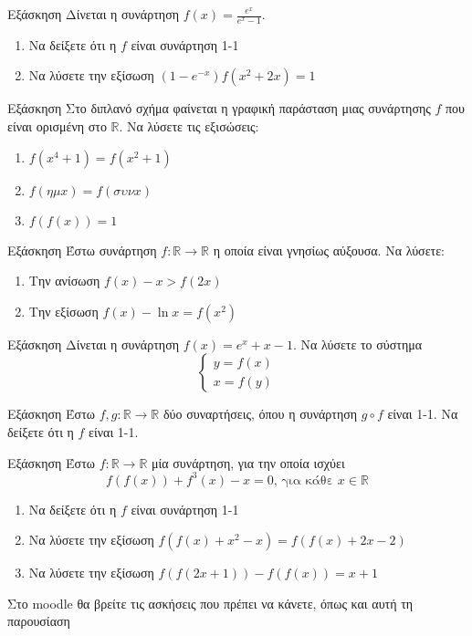 \documentclass[greek]{beamer}
\begin{document}
\begin{frame}{Εξάσκηση}
  Δίνεται η συνάρτηση $f(x)=\frac{e^x}{e^x-1}$.
  \begin{enumerate}
    \item Να δείξετε ότι η $f$ είναι συνάρτηση 1-1 \pause
    \item Να λύσετε την εξίσωση $(1-e^{-x})f(x^2+2x)=1$
  \end{enumerate}
\end{frame}

\begin{frame}{Εξάσκηση}
  Στο διπλανό σχήμα φαίνεται η γραφική παράσταση μιας συνάρτησης $f$ που είναι ορισμένη στο $\mathbb{R}$. Να λύσετε τις εξισώσεις:
  \begin{enumerate}
    \item $f(x^4+1)=f(x^2+1)$ \pause
    \item $f(ημ x)=f(συν x)$ \pause
    \item $f\left( f(x) \right)=1$
  \end{enumerate}
\end{frame}

\begin{frame}{Εξάσκηση}
  Έστω συνάρτηση $f:\mathbb{R}\to \mathbb{R}$ η οποία είναι γνησίως αύξουσα. Να λύσετε:
  \begin{enumerate}
    \item Την ανίσωση $f(x)-x>f(2x)$ \pause
    \item Την εξίσωση $f(x)-\ln x=f(x^2)$
  \end{enumerate}
\end{frame}

\begin{frame}{Εξάσκηση}
  Δίνεται η συνάρτηση $f(x)=e^x+x-1$. Να λύσετε το σύστημα
  $$\begin{cases}
      y=f(x) \\
      x=f(y)
    \end{cases}$$
\end{frame}

\begin{frame}{Εξάσκηση}
  Έστω $f,g:\mathbb{R}\to\mathbb{R}$ δύο συναρτήσεις, όπου η συνάρτηση $g\circ f$ είναι 1-1. Να δείξετε ότι η $f$ είναι 1-1.
\end{frame}

\begin{frame}{Εξάσκηση}
  Έστω $f:\mathbb{R}\to\mathbb{R}$ μία συνάρτηση, για την οποία ισχύει
  $$f\left(f(x)\right)+f^3(x)-x=0\text{, για κάθε }x\in\mathbb{R}$$
  \begin{enumerate}
    \item Να δείξετε ότι η $f$ είναι συνάρτηση 1-1 \pause
    \item Να λύσετε την εξίσωση $f\left(f(x)+x^2-x\right)=f\left(f(x)+2x-2\right)$ \pause
    \item Να λύσετε την εξίσωση $f\left(f(2x+1)\right)-f\left(f(x)\right)=x+1$
  \end{enumerate}
\end{frame}

\begin{frame}
  Στο moodle θα βρείτε τις ασκήσεις που πρέπει να κάνετε, όπως και αυτή τη παρουσίαση
\end{frame}
\end{document}
